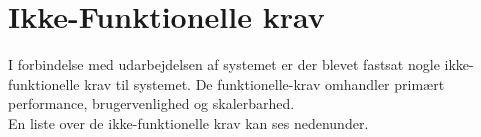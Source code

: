 


\section{Ikke-Funktionelle krav}
I forbindelse med udarbejdelsen af systemet er der blevet fastsat nogle ikke-funktionelle krav til systemet. De funktionelle-krav omhandler primært performance, brugervenlighed og skalerbarhed.\\ En liste over de ikke-funktionelle krav kan ses nedenunder.
